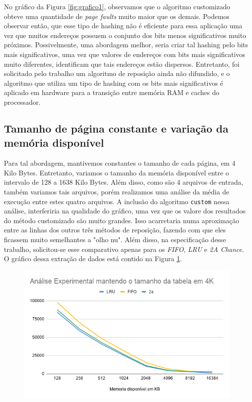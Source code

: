 No gráfico da Figura \ref{fig:grafico1}, observamos que o algoritmo customizado
obteve uma quantidade de \textit{page faults} muito maior que os demais.
Podemos observar então, que esse tipo de hashing não é eficiente para essa aplicação
uma vez que muitos endereços possuem o conjunto dos bits menos significativos muito
próximos.
Possivelmente, uma abordagem melhor, seria criar tal hashing pelo bits mais
significativos, uma vez que valores de endereços com bits mais significativos
muito diferentes, identificam que tais endereços estão dispersos.
Entretanto, foi solicitado pelo trabalho um algoritmo de reposição ainda não
difundido, e o algoritmo que utiliza um tipo de hashing com os bits mais 
significativos é aplicado em hardware para a transição entre memória RAM e 
caches do processador.


\subsection{Tamanho de página constante e variação da memória disponível}
Para tal abordagem, mantivemos constantes o tamanho de cada página, em 4 Kilo
Bytes. Entretanto, variamos o tamanho da memória disponível entre o intervalo
de 128 a 1638 Kilo Bytes.
Além disso, como são 4 arquivos de entrada, também variamos tais arquivos, porém
realizamos uma análise da média de execução entre estes quatro arquivos.
A inclusão do algoritmo \texttt{custom} nessa análise, interferiria na qualidade
do gráfico, uma vez que os valore dos resultados do método customizado são muito
grandes.
Isso acarretaria numa aproximação entre as linhas dos outros três métodos de
reposição, fazendo com que eles ficassem muito semelhantes a "olho nu".
Além disso, na especificação desse trabalho, solicitou-se esse comparativo apenas
para os \textit{FIFO}, \textit{LRU} e \textit{2A Chance}.
O gráfico dessa extração de dados está contido na Figura \ref{fig:grafico2}.

\begin{figure}[h]
	\begin{center}
		\includegraphics[scale=0.7]{Figuras/img2.png}
	\end{center}
	\caption{\label{fig:grafico2} }
\end{figure}

